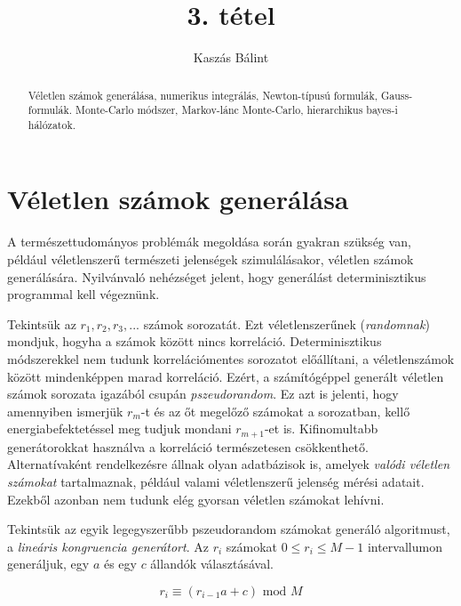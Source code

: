 \documentclass[12pt]{article}
\theoremstyle{plain}
\begin{document}
\title{3. tétel}
\author{Kaszás Bálint}

\maketitle


\begin{abstract}
    Véletlen számok generálása, numerikus integrálás, Newton-típusú formulák, Gauss-formulák. Monte-Carlo módszer, Markov-lánc Monte-Carlo, hierarchikus bayes-i hálózatok.
\end{abstract}

\vfill

\tableofcontents

\newpage

\section{Véletlen számok generálása}
A természettudományos problémák megoldása során gyakran szükség van, például véletlenszerű természeti jelenségek szimulálásakor, véletlen számok generálására. 
Nyilvánvaló nehézséget jelent, hogy generálást determinisztikus programmal kell végeznünk. 

Tekintsük az $r_1, r_2, r_3, ...$ számok sorozatát. Ezt véletlenszerűnek ({\em randomnak}) mondjuk, hogyha a számok között nincs korreláció. Determinisztikus módszerekkel nem tudunk korrelációmentes sorozatot előállítani, a véletlenszámok között mindenképpen marad korreláció. Ezért, a számítógéppel generált véletlen számok sorozata igazából csupán {\em pszeudorandom}. Ez azt is jelenti, hogy amennyiben ismerjük $r_m$-t és az őt megelőző számokat a sorozatban, kellő energiabefektetéssel meg tudjuk mondani $r_{m+1}$-et is. 
Kifinomultabb generátorokkat használva a korreláció természetesen csökkenthető. Alternatívaként rendelkezésre állnak olyan adatbázisok is, amelyek {\em valódi véletlen számokat} tartalmaznak, például valami véletlenszerű jelenség mérési adatait. Ezekből azonban nem tudunk elég gyorsan véletlen számokat lehívni.

Tekintsük az egyik legegyszerűbb pszeudorandom számokat generáló algoritmust, a {\em lineáris kongruencia generátort}. Az $r_i$ számokat $0 \leq r_i \leq M-1$ intervallumon generáljuk, egy $a$ és egy $c$ állandók választásával. 

\begin{equation}
    \label{lincong}
    r_i \equiv (r_{i-1}a + c) \text{ mod } M
\end{equation}
\end{document}
